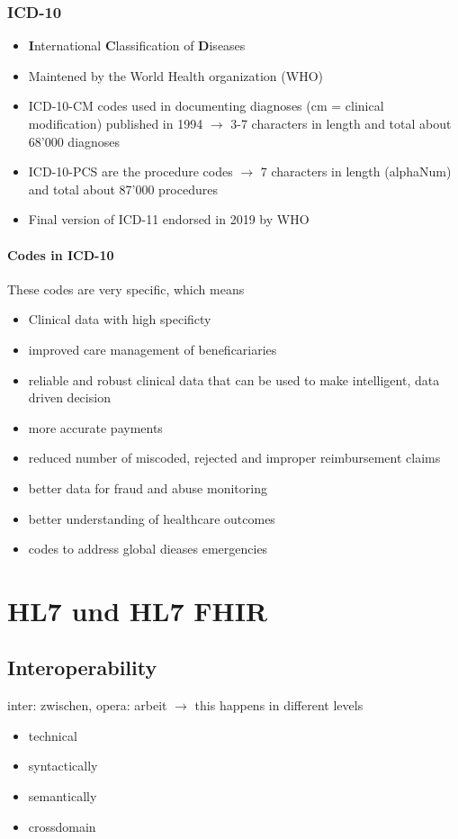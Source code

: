 \documentclass{report}
\theoremstyle{definition}
\theoremstyle{example}
\begin{document}
\subsection{ICD-10}
\begin{itemize}
   \item \textbf{I}nternational \textbf{C}lassification of \textbf{D}iseases
   \item Maintened by the World Health organization (WHO)
   \item ICD-10-CM codes used in documenting diagnoses (cm = clinical modification) published in 1994 $\rightarrow$ 3-7 characters in length and total about 68'000 diagnoses
   \item ICD-10-PCS are the procedure codes $\rightarrow$ 7 characters in length (alphaNum) and total about 87'000 procedures
   \item Final version of ICD-11 endorsed in 2019 by WHO
\end{itemize}

\subsubsection{Codes in ICD-10}
These codes are very specific, which means
\begin{itemize}
   \item Clinical data with high specificty 
   \item improved care management of beneficariaries
   \item reliable and robust clinical data that can be used to make intelligent, data driven decision
   \item more accurate payments
   \item reduced number of miscoded, rejected and improper reimbursement claims
   \item better data for fraud and abuse monitoring
   \item better understanding of healthcare outcomes
   \item codes to address global dieases emergencies
\end{itemize}

\chapter{HL7 und HL7 FHIR}

\section{Interoperability}
inter: zwischen, opera: arbeit $\rightarrow$ this happens in different levels
\begin{itemize}
   \item technical
   \item syntactically
   \item semantically
   \item crossdomain
\end{itemize}
\end{document}
